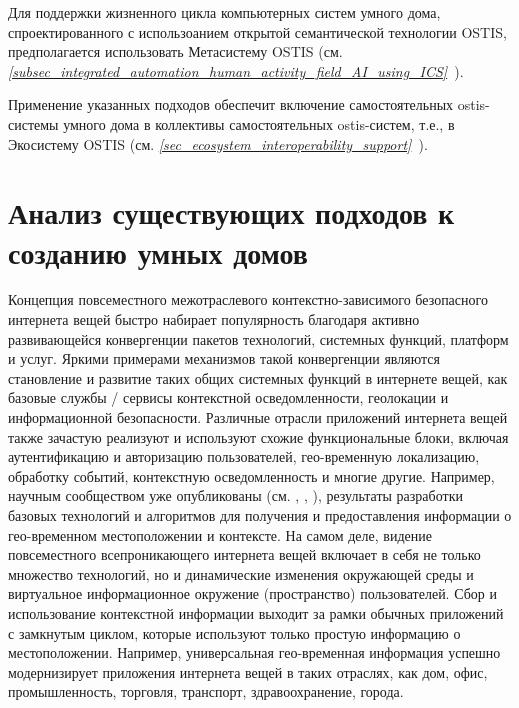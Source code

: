 Для поддержки жизненного цикла компьютерных систем умного дома, спроектированного с использоанием открытой семантической технологии OSTIS, предполагается использовать Метасистему OSTIS (см. \textit{\ref{subsec_integrated_automation_human_activity_field_AI_using_ICS}~}).

Применение указанных подходов обеспечит включение самостоятельных ostis-системы умного дома в коллективы самостоятельных ostis-систем, т.е., в Экосистему OSTIS (см. \textit{\ref{sec_ecosystem_interoperability_support}~}).

\section{Анализ существующих подходов к созданию умных домов}
\label{sec_approach_analysis_for_smart_homes_design}

Концепция повсеместного межотраслевого контекстно-зависимого безопасного интернета вещей быстро набирает популярность благодаря активно развивающейся конвергенции пакетов технологий, системных функций, платформ и услуг. Яркими примерами механизмов такой конвергенции являются становление и развитие таких общих системных функций в интернете вещей, как базовые службы / сервисы контекстной осведомленности, геолокации и информационной безопасности. Различные отрасли приложений интернета вещей также зачастую реализуют и используют схожие функциональные блоки, включая аутентификацию и авторизацию пользователей, гео-временную локализацию, обработку событий, контекстную осведомленность и многие другие. Например, научным сообществом уже опубликованы (см. , , ), результаты разработки базовых технологий и алгоритмов для получения и предоставления информации о гео-временном местоположении и контексте. На самом деле, видение повсеместного всепроникающего интернета вещей включает в себя не только множество технологий, но и динамические изменения окружающей среды и виртуальное информационное окружение (пространство) пользователей. Сбор и использование контекстной информации выходит за рамки обычных приложений с замкнутым циклом, которые используют только простую информацию о местоположении. Например, универсальная гео-временная информация успешно модернизирует приложения интернета вещей в таких отраслях, как дом, офис, промышленность, торговля, транспорт, здравоохранение, города.

